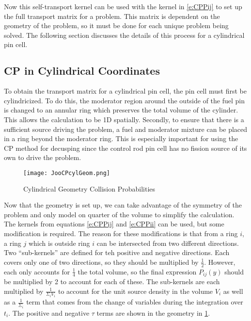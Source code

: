 Now this self-transport kernel can be used with the kernel in \ref{e:CPPij} to set up the full transport matrix for a problem.  This matrix is dependent on the geometry of the problem, so it must be done for each unique problem being solved.  The following section discusses the details of this process for a cylindrical pin cell.

\subsection{CP in Cylindrical Coordinates}\label{appsubsec:CPcylCoord}

To obtain the transport matrix for a cylindrical pin cell, the pin cell must first be cylindricized.  To do this, the moderator region around the outside of the fuel pin is changed to an annular ring which preserves the total volume of the cylinder.  This allows the calculation to be 1D spatially.  Secondly, to ensure that there is a sufficient source driving the problem, a fuel and moderator mixture can be placed in a ring beyond the moderator ring.  This is especially important for using the CP method for decusping since the control rod pin cell has no fission source of its own to drive the problem.

\begin{figure}
  \centering
  \texttt{[image: JooCPcylGeom.png]}
  \caption{Cylindrical Geometry Collision Probabilities}\label{f:CPcylGeom}
\end{figure}

Now that the geometry is set up, we can take advantage of the symmetry of the problem and only model on quarter of the volume to simplify the calculation.  The kernels from equations \ref{e:CPPij} and \ref{e:CPPii} can be used, but some modification is required.  The reason for these modifications is that from a ring $i$, a ring $j$ which is outside ring $i$ can be intersected from two different directions.  Two ``sub-kernels'' are defined for teh positive and negative directions.  Each covers only one of two directions, so they should be multiplied by $\frac{1}{2}$.  However, each only accounts for $\frac{1}{4}$ the total volume, so the final expression $P_{ij}\left(y\right)$ should be multiplied by 2 to account for each of these.  The sub-kernels are each multiplied by $\frac{1}{\Sigma_i V_i}$ to account for the unit source density in the volume $V_i$ as well as a $\frac{1}{\Sigma_i}$ term that comes from the change of variables during the integration over $t_i$.  The positive and negative $\tau$ terms are shown in the geometry in \ref{f:CPcylGeom}.

